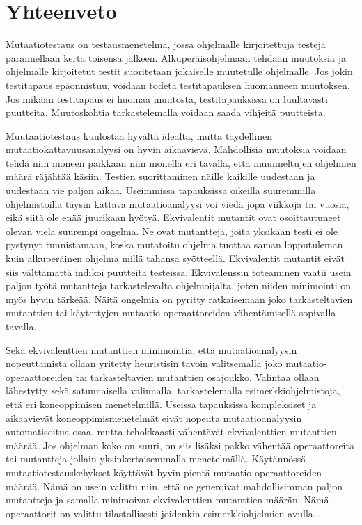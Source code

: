 \documentclass[finnish]{tktltiki2}
\begin{document}
\section{Yhteenveto}
Mutaatiotestaus on testausmenetelmä, jossa ohjelmalle kirjoitettuja testejä parannellaan kerta toisensa jälkeen. Alkuperäisohjelmaan tehdään muutoksia ja ohjelmalle kirjoitetut testit suoritetaan jokaiselle muutetulle ohjelmalle. Jos jokin testitapaus epäonnistuu, voidaan todeta testitapauksen huomanneen muutoksen. Jos mikään testitapaus ei huomaa muutosta, testitapauksissa on luultavasti puutteita. Muutoskohtia tarkastelemalla voidaan saada vihjeitä puutteista. 

Muutaatiotestaus kuulostaa hyvältä idealta, mutta täydellinen mutaatiokattavuusanalyysi on hyvin aikaavievä. Mahdollisia muutoksia voidaan tehdä niin moneen paikkaan niin monella eri tavalla, että muunneltujen ohjelmien määrä räjähtää käsiin. Testien suorittaminen näille kaikille uudestaan ja uudestaan vie paljon aikaa. Useimmissa tapauksissa oikeilla suuremmilla ohjelmistoilla täysin kattava mutaatioanalyysi voi viedä jopa viikkoja tai vuosia, eikä siitä ole enää juurikaan hyötyä. Ekvivalentit mutantit ovat osoittautuneet olevan vielä suurempi ongelma. Ne ovat mutantteja, joita yksikään testi ei ole pystynyt tunnistamaan, koska mutatoitu ohjelma tuottaa saman lopputuleman kuin alkuperäinen ohjelma millä tahansa syötteellä. Ekvivalentit mutantit eivät siis välttämättä indikoi puutteita testeissä. Ekvivalenssin toteaminen vaatii usein paljon työtä mutantteja tarkastelevalta ohjelmoijalta, joten niiden minimointi on myös hyvin tärkeää. Näitä ongelmia on pyritty ratkaisemaan joko tarkasteltavien mutanttien tai käytettyjen mu\-taa\-tio\--ope\-raatto\-reiden vähentämisellä sopivalla tavalla. 

Sekä ekvivalenttien mutanttien minimointia, että mutaatioanalyysin nopeuttamista ollaan yritetty heuristisin tavoin valitsemalla joko mu\-taa\-tio\--ope\-raatto\-reiden tai tarkasteltavien mutanttien osajoukko. Valintaa ollaan lähestytty sekä satunnaisella valinnalla, tarkastelemalla esimerkkiohjelmistoja, että eri koneoppimisen menetelmillä. Useissa tapauksissa kompleksiset ja aikaavievät koneoppimismenetelmät eivät nopeuta mutaatioanalyysin automatisoitua osaa, mutta tehokkaasti vähentävät ekvivalenttien mutanttien määrää. Jos ohjelman koko on suuri, on siis lisäksi pakko vähentää operaattoreita tai mutantteja jollain yksinkertaisemmalla menetelmällä. Käytännössä mutaatiotestauskehykset käyttävät hyvin pientä mutaatio-operaattoreiden määrää. Nämä on usein valittu niin, että ne generoivat mahdollisimman paljon mutantteja ja samalla minimoivat ekvivalenttien mutanttien määrän. Nämä operaattorit on valittu tilastollisesti joidenkin esimerkkiohjelmien avulla.



\end{document}
